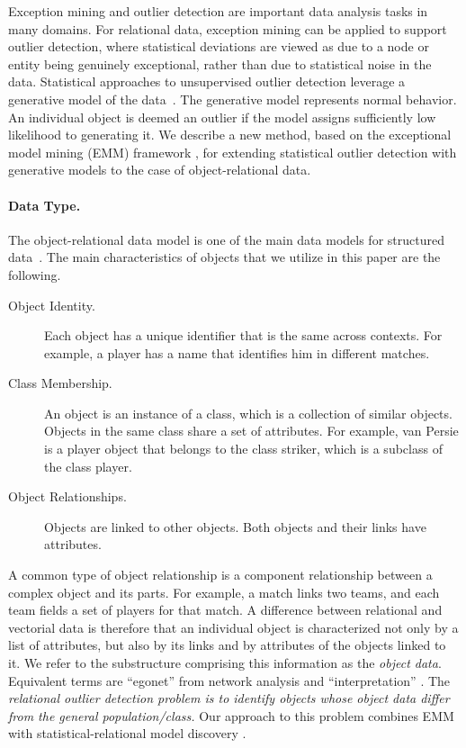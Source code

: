 {

Exception mining and outlier detection are important data analysis tasks in many domains. For relational data, exception mining can be applied to support outlier detection, where statistical deviations are viewed as due to a node or entity being genuinely exceptional, rather than due to statistical noise in the data. Statistical approaches to unsupervised outlier detection leverage a generative model of the data~\citep{aggarwal2013}. The generative model represents normal behavior. An individual object is deemed an outlier if  the model assigns sufficiently low likelihood to generating it. 
We describe a new method, based on the exceptional model mining (EMM) framework \citep{Duivesteijn2016}, for extending statistical  outlier detection with generative models to the case of object-relational data. 



\paragraph{Data Type.} The object-relational data model is one of the main data models for structured data~\citep{Koller1997}. The main 
characteristics of objects that we utilize in this paper are the following. 

\begin{description}
\item[Object Identity.] Each object has a unique identifier that is the same across contexts. For example, a player has a name that identifies him in different matches. 
\item[Class Membership.] An object is an instance of a class, which is a collection of similar objects. Objects in the same class share a set of attributes. For example, van Persie is a player object that belongs to the class striker, which is a subclass of the  class player.
\item[Object Relationships.] Objects are linked  to other objects. Both objects and their links have attributes. 
\end{description}


A common type of object relationship is a component relationship between a complex object and its parts.
For example, a match links two teams, and each team fields a set of players for that match. A difference between relational and vectorial data is therefore that an individual object is characterized not only by a list of attributes, but also by its links and by attributes of the objects linked to it. We refer to the substructure comprising this information as the {\em object data}. Equivalent terms are ``egonet'' from network analysis \citep{Akoglu2015} and ``interpretation'' \citep{Maervoet2012}. The {\em relational outlier detection problem is to identify objects whose object data differ from the general population/class.} Our approach to this problem combines EMM with statistical-relational model discovery \citep{SRL2007}.

}
